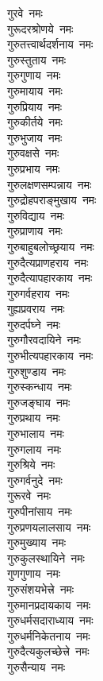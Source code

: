 \begin{multicols}{2}
\begin{flushleft}
गुरवे~नमः\\
गुरूदरश्रोणये~नमः\\
गुरुतत्त्वार्थदर्शनाय~नमः\hfill{}\\
गुरुस्तुताय~नमः\\
गुरुगुणाय~नमः\\
गुरुमायाय~नमः\\
गुरुप्रियाय~नमः\\
गुरुकीर्तये~नमः\\
गुरुभुजाय~नमः\\
गुरुवक्षसे~नमः\\
गुरुप्रभाय~नमः\\
गुरुलक्षणसम्पन्नाय~नमः\\
गुरुद्रोहपराङ्मुखाय~नमः\hfill{}\\
गुरुविद्याय~नमः\\
गुरुप्राणाय~नमः\\
गुरुबाहुबलोच्छ्रयाय~नमः\\
गुरुदैत्यप्राणहराय~नमः\\
गुरुदैत्यापहारकाय~नमः\\
गुरुगर्वहराय~नमः\\
गुह्यप्रवराय~नमः\\
गुरुदर्पघ्ने~नमः\\
गुरुगौरवदायिने~नमः\\
गुरुभीत्यपहारकाय~नमः\hfill{}\\
गुरुशुण्डाय~नमः\\
गुरुस्कन्धाय~नमः\\
गुरुजङ्घाय~नमः\\
गुरुप्रथाय~नमः\\
गुरुभालाय~नमः\\
गुरुगलाय~नमः\\
गुरुश्रिये~नमः\\
गुरुगर्वनुदे~नमः\\
गुरूरवे~नमः\\
गुरुपीनांसाय~नमः\hfill{}\\
गुरुप्रणयलालसाय~नमः\\
गुरुमुख्याय~नमः\\
गुरुकुलस्थायिने~नमः\\
गुणगुणाय~नमः\\
गुरुसंशयभेत्त्रे~नमः\\
गुरुमानप्रदायकाय~नमः\\
गुरुधर्मसदाराध्याय~नमः\\
गुरुधर्मनिकेतनाय~नमः\\
गुरुदैत्यकुलच्छेत्त्रे~नमः\\
गुरुसैन्याय~नमः\hfill{}\\

\end{flushleft}
\end{multicols}
